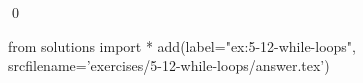
\begin{ex}
  \label{ex:5-12-while-loops}
  
  \qed
\end{ex}
\begin{python0}
from solutions import *
add(label="ex:5-12-while-loops",
    srcfilename='exercises/5-12-while-loops/answer.tex')
\end{python0}
